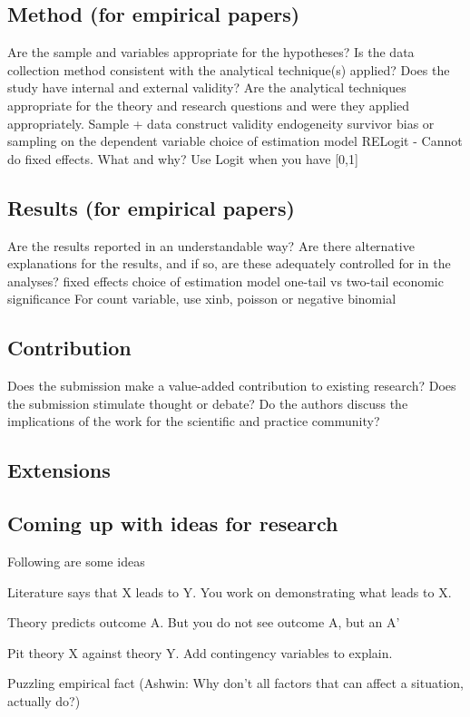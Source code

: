 \documentclass[12pt,letterpaper]{article}
\begin{document}
\subsection{Method (for empirical papers)}
Are the sample and variables appropriate for the hypotheses?
Is the data collection method consistent with the analytical technique(s) applied?
Does the study have internal and external validity?
Are the analytical techniques appropriate for the theory and research questions and were they applied appropriately.
Sample + data
construct validity
endogeneity
survivor bias or sampling on the dependent variable
choice of estimation model
RELogit - Cannot do fixed effects. What and why? \cite{Zhou2011}
Use Logit when you have [0,1]
\par
\subsection{Results (for empirical papers)}
Are the results reported in an understandable way?
Are there alternative explanations for the results, and if so, are these adequately controlled for in the analyses?
fixed effects
choice of estimation model
one-tail vs two-tail
economic significance
For count variable, use xinb, poisson or negative binomial

\subsection{Contribution}
Does the submission make a value-added contribution to existing research?
Does the submission stimulate thought or debate?
Do the authors discuss the implications of the work for the scientific and practice community?

\subsection{Extensions}
\subsection{Coming up with ideas for research}
Following are some ideas\par
Literature says that X leads to Y. You work on demonstrating what leads to X.\par
Theory predicts outcome A. But you do not see outcome A, but an A'\par
Pit theory X against theory Y. Add contingency variables to explain.\par
Puzzling empirical fact (Ashwin: Why don’t all factors that can affect a situation, actually do?)\par
\end{document}
